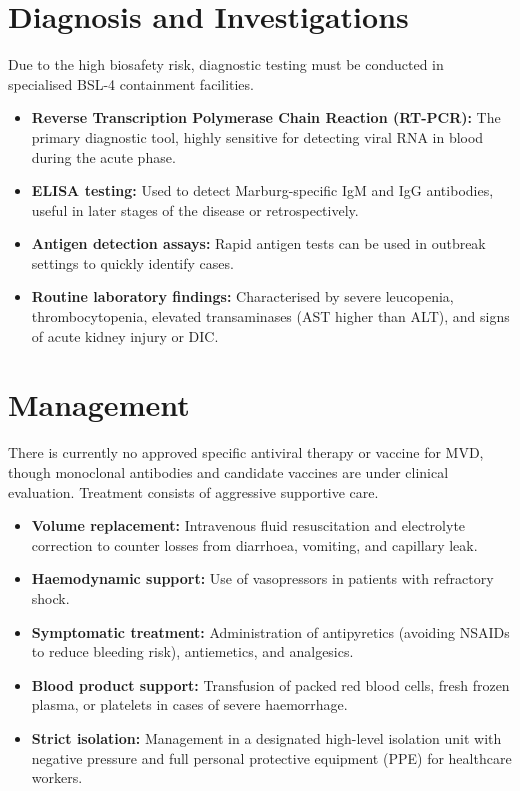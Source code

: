 \section*{Diagnosis and Investigations}
Due to the high biosafety risk, diagnostic testing must be conducted in specialised BSL-4 containment facilities.
\begin{itemize}
    \item \textbf{Reverse Transcription Polymerase Chain Reaction (RT-PCR):} The primary diagnostic tool, highly sensitive for detecting viral RNA in blood during the acute phase.
    \item \textbf{ELISA testing:} Used to detect Marburg-specific IgM and IgG antibodies, useful in later stages of the disease or retrospectively.
    \item \textbf{Antigen detection assays:} Rapid antigen tests can be used in outbreak settings to quickly identify cases.
    \item \textbf{Routine laboratory findings:} Characterised by severe leucopenia, thrombocytopenia, elevated transaminases (AST higher than ALT), and signs of acute kidney injury or DIC.
\end{itemize}

\section*{Management}
There is currently no approved specific antiviral therapy or vaccine for MVD, though monoclonal antibodies and candidate vaccines are under clinical evaluation. Treatment consists of aggressive supportive care.
\begin{itemize}
    \item \textbf{Volume replacement:} Intravenous fluid resuscitation and electrolyte correction to counter losses from diarrhoea, vomiting, and capillary leak.
    \item \textbf{Haemodynamic support:} Use of vasopressors in patients with refractory shock.
    \item \textbf{Symptomatic treatment:} Administration of antipyretics (avoiding NSAIDs to reduce bleeding risk), antiemetics, and analgesics.
    \item \textbf{Blood product support:} Transfusion of packed red blood cells, fresh frozen plasma, or platelets in cases of severe haemorrhage.
    \item \textbf{Strict isolation:} Management in a designated high-level isolation unit with negative pressure and full personal protective equipment (PPE) for healthcare workers.
\end{itemize}

